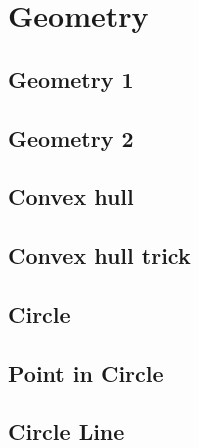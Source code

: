 
\section{Geometry}
\subsection{Geometry 1}
\raggedbottom
\subsection{Geometry 2}
\raggedbottom
\subsection{Convex hull}
\subsection{Convex hull trick}
\raggedbottom
\raggedbottom
\subsection{Circle}
\raggedbottom
\subsection{Point in Circle}
\raggedbottom
\subsection{Circle Line}
\raggedbottom
\hrulefill